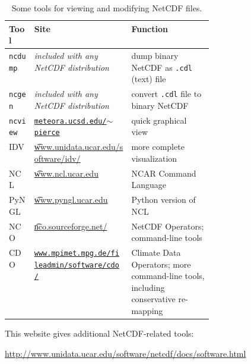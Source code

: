 \newcommand{\netcdftool}[1]{#1\index{NetCDF!tools!#1}}
\begin{table}[ht]
\centering
\caption{Some tools for viewing and modifying NetCDF files.}\label{tab:NetCDFview} 
\small
\begin{tabular}{llp{0.4\linewidth}}
  \\\toprule
  \textbf{Tool} & \textbf{Site} & \textbf{Function}\\ \midrule
\netcdftool{\texttt{ncdump}} & \emph{included with any NetCDF distribution} & dump binary NetCDF as \texttt{.cdl} (text) file \\
\netcdftool{\texttt{ncgen}} & \emph{included with any NetCDF distribution} & convert \texttt{.cdl} file to binary NetCDF \\
\netcdftool{\texttt{ncview}} & \href{http://meteora.ucsd.edu/~pierce/ncview_home_page.html}{\texttt{meteora.ucsd.edu/$\sim$pierce}} & quick graphical view \\
\netcdftool{IDV} & \href{http://www.unidata.ucar.edu/software/idv/}{\t{www.unidata.ucar.edu/software/idv/}} & more complete visualization \\
\netcdftool{NCL} &  \href{http://www.ncl.ucar.edu}{\t{www.ncl.ucar.edu}} & NCAR Command Language\\
\netcdftool{PyNGL} &  \href{http://www.pyngl.ucar.edu}{\t{www.pyngl.ucar.edu}} & Python version of NCL\\
\netcdftool{NCO}\index{NCO (NetCDF Operators)} & \href{http://nco.sourceforge.net/}{\t{nco.sourceforge.net/}} & NetCDF Operators; command-line tools\\
\netcdftool{CDO} & \href{http://code.zmaw.de/projects/cdo}{\texttt{www.mpimet.mpg.de/fileadmin/software/cdo/}} & Climate Data Operators; more command-line tools, including conservative re-mapping
\\\bottomrule
\end{tabular}
\normalsize
\end{table}

This website gives additional NetCDF-related tools:

\centerline{ \url{http://www.unidata.ucar.edu/software/netcdf/docs/software.html} } 




